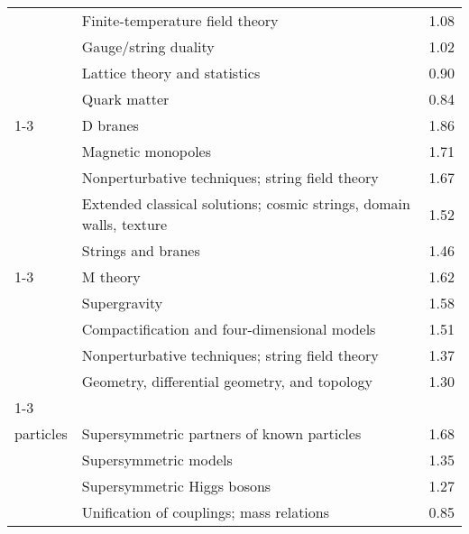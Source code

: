 \begin{longtable}[H]{p{}|p{}|p{}}
                                        & Finite-temperature field theory &  1.08 \\
                                        & Gauge/string duality &  1.02 \\
                                        & Lattice theory and statistics &  0.90 \\
                                        & Quark matter &  0.84 \\
\cline{1-3}
\multirow{5}{*}{\begin{tabular}{l}String theory\end{tabular}} & D branes &  1.86 \\
                                        & Magnetic monopoles &  1.71 \\
                                        & Nonperturbative techniques; string field theory &  1.67 \\
                                        & Extended classical solutions; cosmic strings, domain walls, texture &  1.52 \\
                                        & Strings and branes &  1.46 \\
\cline{1-3}
\multirow{5}{*}{\begin{tabular}{l}Supergravity\end{tabular}} & M theory &  1.62 \\
                                        & Supergravity &  1.58 \\
                                        & Compactification and four-dimensional models &  1.51 \\
                                        & Nonperturbative techniques; string field theory &  1.37 \\
                                        & Geometry, differential geometry, and topology &  1.30 \\
\cline{1-3}
\multirow{5}{*}{\begin{tabular}{l}Supersymmetric\\ particles\end{tabular}} & Supersymmetric partners of known particles &  1.68 \\
                                        & Supersymmetric models &  1.35 \\
                                        & Supersymmetric Higgs bosons &  1.27 \\
                                        & Unification of couplings; mass relations &  0.85 \\

\end{longtable}
